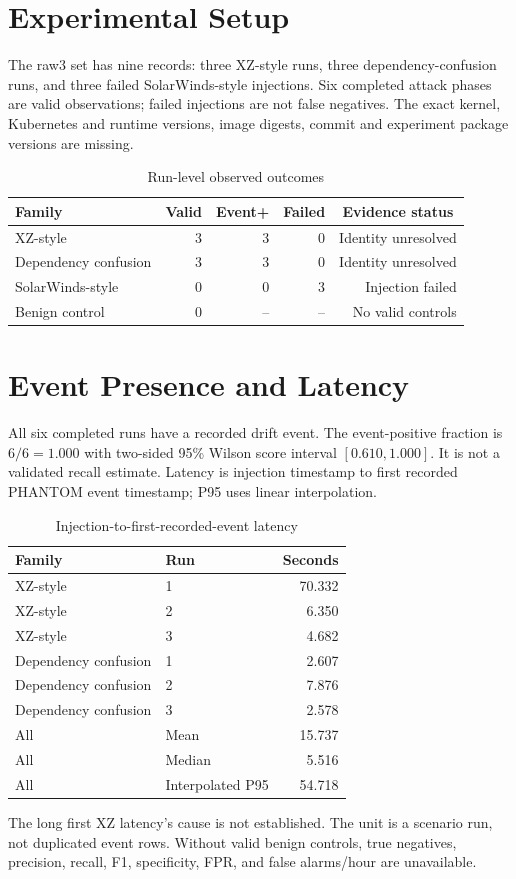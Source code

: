 \documentclass[12pt,a4paper,oneside]{report}
\begin{document}
\section{Experimental Setup}
The raw3 set has nine records: three XZ-style runs, three dependency-confusion runs, and three failed SolarWinds-style injections. Six completed attack phases are valid observations; failed injections are not false negatives. The exact kernel, Kubernetes and runtime versions, image digests, commit and experiment package versions are missing.
\begin{table}[htbp]\centering\caption{Run-level observed outcomes}\label{tab:runs}\begin{tabularx}{\textwidth}{Xrrrr}\toprule Family&Valid&Event+&Failed&\multicolumn{1}{c}{Evidence status}\\\midrule XZ-style&3&3&0&Identity unresolved\\Dependency confusion&3&3&0&Identity unresolved\\SolarWinds-style&0&0&3&Injection failed\\Benign control&0&--&--&No valid controls\\\bottomrule\end{tabularx}\end{table}
\section{Event Presence and Latency}
All six completed runs have a recorded drift event. The event-positive fraction is $6/6=1.000$ with two-sided 95\% Wilson score interval $[0.610,1.000]$. It is not a validated recall estimate. Latency is injection timestamp to first recorded PHANTOM event timestamp; P95 uses linear interpolation.
\begin{table}[htbp]\centering\caption{Injection-to-first-recorded-event latency}\label{tab:latency}\begin{tabular}{llr}\toprule Family&Run&Seconds\\\midrule XZ-style&1&70.332\\XZ-style&2&6.350\\XZ-style&3&4.682\\Dependency confusion&1&2.607\\Dependency confusion&2&7.876\\Dependency confusion&3&2.578\\\midrule All&Mean&15.737\\All&Median&5.516\\All&Interpolated P95&54.718\\\bottomrule\end{tabular}\end{table}
The long first XZ latency's cause is not established. The unit is a scenario run, not duplicated event rows. Without valid benign controls, true negatives, precision, recall, F1, specificity, FPR, and false alarms/hour are unavailable.
\end{document}
